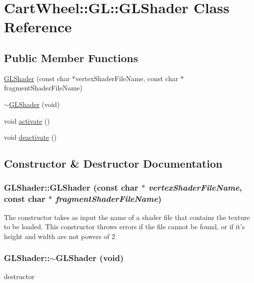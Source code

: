 \hypertarget{classCartWheel_1_1GL_1_1GLShader}{
\section{CartWheel::GL::GLShader Class Reference}
\label{classCartWheel_1_1GL_1_1GLShader}
}
\subsection*{Public Member Functions}
\begin{DoxyCompactItemize}
\item 
\hyperlink{classCartWheel_1_1GL_1_1GLShader_a49e3f04b6220e30cefe9bf4dc061c1ec}{GLShader} (const char $\ast$vertexShaderFileName, const char $\ast$fragmentShaderFileName)
\item 
\hyperlink{classCartWheel_1_1GL_1_1GLShader_ac110c32383fe8801b5592d22b929adb9}{$\sim$GLShader} (void)
\item 
void \hyperlink{classCartWheel_1_1GL_1_1GLShader_a1e1f376f1406f483fbd24dfc47e26e00}{activate} ()
\item 
void \hyperlink{classCartWheel_1_1GL_1_1GLShader_a1cd3547b8b8eeba8645cee7f4f585a3a}{deactivate} ()
\end{DoxyCompactItemize}


\subsection{Constructor \& Destructor Documentation}
\hypertarget{classCartWheel_1_1GL_1_1GLShader_a49e3f04b6220e30cefe9bf4dc061c1ec}{
\subsubsection[{GLShader}]{\setlength{\rightskip}{0pt plus 5cm}GLShader::GLShader (const char $\ast$ {\em vertexShaderFileName}, \/  const char $\ast$ {\em fragmentShaderFileName})}}
\label{classCartWheel_1_1GL_1_1GLShader_a49e3f04b6220e30cefe9bf4dc061c1ec}
The constructor takes as input the name of a shader file that contains the texture to be loaded. This constructor throws errors if the file cannot be found, or if it's height and width are not powers of 2 \hypertarget{classCartWheel_1_1GL_1_1GLShader_ac110c32383fe8801b5592d22b929adb9}{
\subsubsection[{$\sim$GLShader}]{\setlength{\rightskip}{0pt plus 5cm}GLShader::$\sim$GLShader (void)}}
\label{classCartWheel_1_1GL_1_1GLShader_ac110c32383fe8801b5592d22b929adb9}
destructor 

